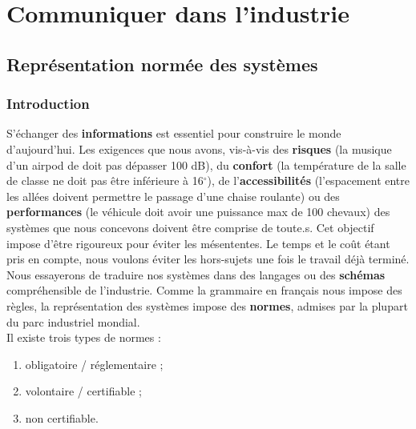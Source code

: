 \documentclass[
	11pt, %
	fleqn, %
	a4paper, %
]{LegrandOrangeBook}
\begin{document}


\part{Communiquer dans l'industrie}


\chapter{Représentation normée des systèmes}

\section{Introduction}


S’échanger des \textbf{informations} est essentiel pour construire le monde d’aujourd’hui. Les exigences que nous avons, vis-à-vis des \textbf{risques} (la musique d'un airpod de doit pas dépasser 100 dB), du \textbf{confort} (la température de la salle de classe ne doit pas être inférieure à 16$^{\circ}$), de l'\textbf{accessibilités} (l'espacement entre les allées doivent permettre le passage d'une chaise roulante) ou des \textbf{performances} (le véhicule doit avoir une puissance max de 100 chevaux) des systèmes que nous concevons doivent être comprise de toute.s. Cet objectif impose d’être rigoureux pour éviter les mésententes. Le temps et le coût étant pris en compte, nous voulons éviter les hors-sujets une fois le travail déjà terminé. Nous essayerons de traduire nos systèmes dans des langages ou des \textbf{schémas} compréhensible de l’industrie. Comme la grammaire en français nous impose des règles, la représentation des systèmes impose des \textbf{normes}, admises par la plupart du parc industriel mondial.\\


Il existe trois types de normes :
\begin{enumerate}
    \item obligatoire / réglementaire ;
    \item volontaire / certifiable ;
    \item non certifiable.
\end{enumerate}
\end{document}
